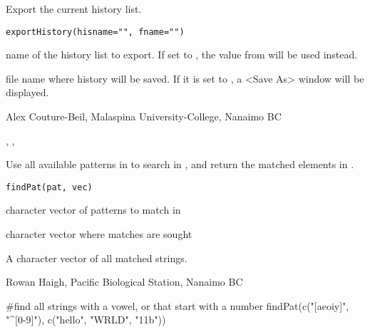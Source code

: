 \documentclass[letterpaper]{book}
\begin{document}
\begin{Description}\relax
Export the current history list.
\end{Description}
\begin{Usage}
\begin{verbatim}
exportHistory(hisname="", fname="")
\end{verbatim}
\end{Usage}
\begin{Arguments}
\begin{ldescription}
\item[\code{hisname}] name of the history list to export. If set to , 
the value from  will be used instead.
\item[\code{fname}] file name where history will be saved. If it is set to , 
a \textless{}Save As\textgreater{} window will be displayed.
\end{ldescription}
\end{Arguments}
\begin{Author}\relax
Alex Couture-Beil, Malaspina University-College, Nanaimo BC
\end{Author}
\begin{SeeAlso}\relax
{}, , 
\end{SeeAlso}

\begin{Description}\relax
Use all available patterns in  to search in , 
and return the matched elements in .
\end{Description}
\begin{Usage}
\begin{verbatim}
findPat(pat, vec)
\end{verbatim}
\end{Usage}
\begin{Arguments}
\begin{ldescription}
\item[\code{pat}] character vector of patterns to match in 
\item[\code{vec}] character vector where matches are sought
\end{ldescription}
\end{Arguments}
\begin{Value}
A character vector of all matched strings.
\end{Value}
\begin{Author}\relax
Rowan Haigh, Pacific Biological Station, Nanaimo BC
\end{Author}
\begin{Examples}
\begin{ExampleCode}
#find all strings with a vowel, or that start with a number
findPat(c("[aeoiy]", "^[0-9]"), c("hello", "WRLD", "11b"))
\end{ExampleCode}
\end{Examples}
\end{document}
